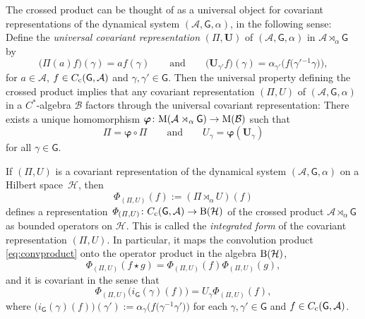 \documentclass[pdftex]{sigma}
\numberwithin{equation}{section}
\newcommand{\mbf}[1]{{\boldsymbol {#1} }}
\newcommand{\sfG}{\mathsf{G}}
\newcommand{\Pim}{{\mathit\Pi}}
\def\alg{{\mathcal A}}
\def\balg{{\mathcal B}}
\def\hil{{\mathcal H}}
\begin{document}
The crossed product can be thought of as a universal
object for covariant representations of the dynamical system
$(\alg,\sfG,\alpha)$, in the following sense: Define the \emph{universal
 covariant representation} $(\mbf\Pim,\mbf U)$ of $(\alg,\sfG,\alpha)$
in $\alg\rtimes_\alpha \sfG$ by
\[
\big(\mbf\Pim(a)f\big)(\gamma)=a f(\gamma) \qquad \mbox{and} \qquad
\big(\mbf U_{\gamma'}f\big)(\gamma) =
\alpha_{\gamma'}\big(f\big(\gamma'{}^{-1} \gamma\big)\big) ,
\]
for $a\in\alg$, $f\in C_{\rm c}(\sfG,\alg)$ and $\gamma,\gamma'\in \sfG$. Then the
universal property defining the crossed product implies that any covariant representation $(\Pim,U)$ of
$(\alg,\sfG,\alpha)$ in a $C^*$-algebra $\balg$ factors through the
universal covariant representation: There exists a unique homomorphism
\mbox{$\mbf\varphi\colon {\rm M}(\alg\rtimes_\alpha \sfG)\to{\rm M}(\balg)$} such that
\[
\Pim=\mbf\varphi\circ\mbf\Pim \qquad \mbox{and} \qquad U_\gamma =
\mbf\varphi(\mbf U_\gamma)
\]
for all $\gamma\in \sfG$.

If $(\Pim,U)$ is a covariant representation of the dynamical system
$(\alg,\sfG,\alpha)$ on a Hilbert space~$\hil$, then
\[
{\mathit\Phi}_{(\Pim,U)}(f):=(\Pim\rtimes_\alpha U)(f)
\]
defines a representation ${\mathit\Phi}_{(\Pim,U)}\colon C_{\rm c}(\sfG,\alg)\to{\rm B}(\hil)$
of the crossed product $\alg\rtimes_\alpha \sfG$ as bounded operators on
$\hil$. This is called the \emph{integrated form} of the covariant
representation $(\Pim,U)$. In particular, it maps the convolution
product \eqref{eq:convproduct} onto the operator product in the
algebra ${\rm B}(\hil)$,
\[
{\mathit\Phi}_{(\Pim,U)}(f\star g) = {\mathit\Phi}_{(\Pim,U)}(f)
{\mathit\Phi}_{(\Pim,U)}(g) ,
\]
and it is covariant in the sense that
\[
{\mathit\Phi}_{(\Pim,U)}\big(i_\sfG(\gamma)(f)\big) = U_\gamma
{\mathit\Phi}_{(\Pim,U)}(f) ,
\]
where $\big(i_\sfG(\gamma)(f)\big)(\gamma'):=\alpha_\gamma\big(f\big(\gamma^{-1}
\gamma'\big)\big)$ for each $\gamma,\gamma'\in \sfG$ and $f\in C_{\rm
 c}(\sfG,\alg)$.
\end{document}
